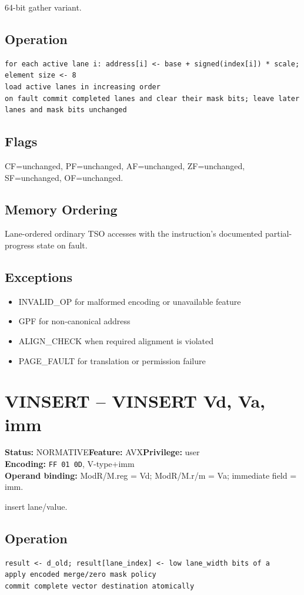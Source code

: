 \documentclass[10pt]{article}
\begin{document}
64-bit gather variant.

\subsection*{Operation}
\begin{lstlisting}
for each active lane i: address[i] <- base + signed(index[i]) * scale; element size <- 8
load active lanes in increasing order
on fault commit completed lanes and clear their mask bits; leave later lanes and mask bits unchanged
\end{lstlisting}
\subsection*{Flags}
CF=unchanged, PF=unchanged, AF=unchanged, ZF=unchanged, SF=unchanged, OF=unchanged.
\subsection*{Memory Ordering}
Lane-ordered ordinary TSO accesses with the instruction's documented partial-progress state on fault.
\subsection*{Exceptions}
\begin{itemize}
\item INVALID\_OP for malformed encoding or unavailable feature
\item GPF for non-canonical address
\item ALIGN\_CHECK when required alignment is violated
\item PAGE\_FAULT for translation or permission failure
\end{itemize}
\clearpage

\section{VINSERT -- VINSERT Vd, Va, imm}
\textbf{Status:} NORMATIVE\quad \textbf{Feature:} AVX\quad \textbf{Privilege:} user\\
\textbf{Encoding:} \texttt{FF 01 0D}, V-type+imm\\
\textbf{Operand binding:} ModR/M.reg = Vd; ModR/M.r/m = Va; immediate field = imm.

insert lane/value.

\subsection*{Operation}
\begin{lstlisting}
result <- d_old; result[lane_index] <- low lane_width bits of a
apply encoded merge/zero mask policy
commit complete vector destination atomically
\end{lstlisting}
\end{document}
